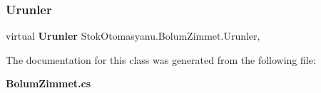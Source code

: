 \mbox{\label{class_stok_otomasyanu_1_1_bolum_zimmet_a0ca04765d53c18ce4dcb7f28a4f34234}} 
\subsubsection{Urunler}
{\footnotesize\ttfamily virtual \textbf{ Urunler} Stok\+Otomasyanu.\+Bolum\+Zimmet.\+Urunler\hspace{0.3cm}{\ttfamily [get]}, {\ttfamily [set]}}



The documentation for this class was generated from the following file\+:\begin{DoxyCompactItemize}
\item 
\textbf{ Bolum\+Zimmet.\+cs}\end{DoxyCompactItemize}
